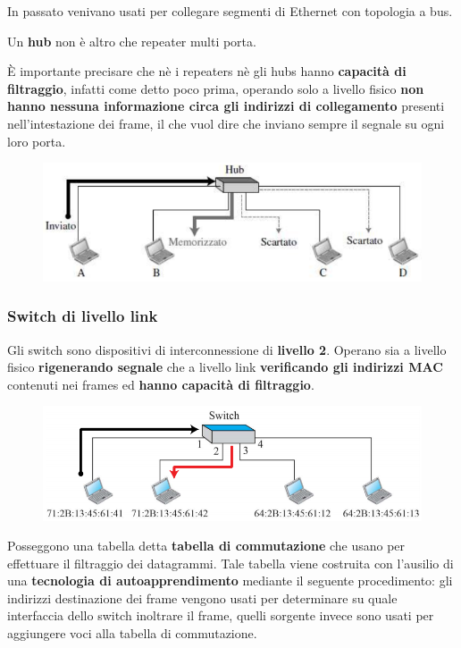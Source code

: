\documentclass[11pt,a4paper,oneside]{book}
\theoremstyle{definition}
\begin{document}
In passato venivano usati per collegare segmenti di Ethernet con topologia a bus.

Un \textbf{hub} non è altro che repeater multi porta.

È importante precisare che nè i repeaters nè gli hubs hanno \textbf{capacità di filtraggio}, infatti come detto poco prima, operando solo a livello fisico \textbf{non hanno nessuna informazione circa gli indirizzi di collegamento} presenti nell'intestazione dei frame, il che vuol dire che inviano sempre il segnale su ogni loro porta.

\pagebreak

\begin{figure}[!h]
	\includegraphics[scale=0.55]{Immagini/Hub.png}
	\centering
\end{figure}

\subsubsection{Switch di livello link}

Gli switch sono dispositivi di interconnessione di \textbf{livello 2}. Operano sia a livello fisico \textbf{rigenerando segnale} che a livello link \textbf{verificando gli indirizzi MAC} contenuti nei frames ed \textbf{hanno capacità di filtraggio}.

\begin{figure}[!h]
	\includegraphics[scale=0.45]{Immagini/Switch.png}
	\centering
\end{figure}

Posseggono una tabella detta \textbf{tabella di commutazione} che usano per effettuare il filtraggio dei datagrammi. Tale tabella viene costruita con l'ausilio di una \textbf{tecnologia di autoapprendimento} mediante il seguente procedimento: gli indirizzi destinazione dei frame vengono usati per determinare su quale interfaccia dello switch inoltrare il frame, quelli sorgente invece sono usati per aggiungere voci alla tabella di commutazione.
\end{document}
